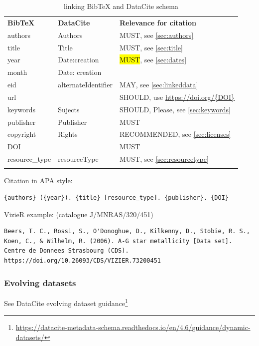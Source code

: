 \documentclass[11pt,a4paper]{ivoa}
\begin{document}
\begin{table}[th]
	\begin{tabular}{lll}
		\sptablerule
		\textbf{BibTeX} & \textbf{DataCite} & \textbf{Relevance for citation} \\
		\sptablerule
		\sptablerule
	authors & Authors & MUST, see \ref{sec:authors} \\
	title & Title & MUST, see \ref{sec:title}\\
	year &  Date:creation & \hl{MUST}, see \ref{sec:dates} \\
	month & Date: creation & \\
	eid & alternateIdentifier & MAY, see \ref{sec:linkeddata}\\
	url & & SHOULD, use \url{https://doi.org/{DOI}} \\
	keywords & Sujects & SHOULD, Please, see \ref{sec:keywords} \\
	publisher & Publisher & MUST \\
    copyright & Rights & RECOMMENDED, see \ref{sec:licenses} \\
    DOI & & MUST \\
    resource\_type  & resourceType & MUST, see \ref{sec:resourcetype}\\
    \sptablerule
	\end{tabular}%
\caption{\label{tab:tex}linking BibTeX and DataCite schema}
\end{table}

Citation in APA style:
\begin{verbatim}
{authors} ({year}). {title} [resource_type]. {publisher}. {DOI}
\end{verbatim}

VizieR example: (catalogue J/MNRAS/320/451)
\begin{verbatim}
Beers, T. C., Rossi, S., O'Donoghue, D., Kilkenny, D., Stobie, R. S.,
Koen, C., & Wilhelm, R. (2006). A-G star metallicity [Data set]. 
Centre de Donnees Strasbourg (CDS). https://doi.org/10.26093/CDS/VIZIER.73200451
\end{verbatim}

\subsubsection{Evolving datasets}

See DataCite evolving dataset guidance\footnote{\url{https://datacite-metadata-schema.readthedocs.io/en/4.6/guidance/dynamic-datasets/}}\\
\end{document}
